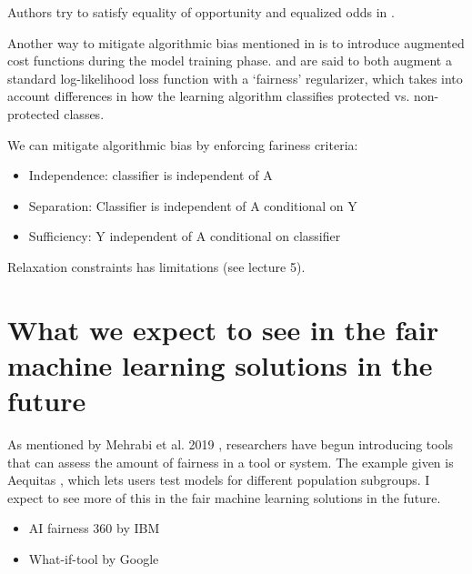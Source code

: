 \documentclass[conference]{IEEEtran}
\begin{document}
Authors try to satisfy equality of opportunity and equalized odds in \cite{DBLP:journals/corr/HardtPS16}.

Another way to mitigate algorithmic bias mentioned in \cite{d_Alessandro_2017} is to introduce augmented cost functions during the model training phase. \cite{article} and \cite{DBLP:journals/corr/Zliobaite15} are said to both augment a standard log-likelihood loss function with a ‘fairness’ regularizer, which takes into account differences in how the learning algorithm classifies protected vs. non-protected classes.

We can mitigate algorithmic bias by enforcing fariness criteria:
\begin{itemize}
    \item Independence: classifier is independent of A
    \item Separation: Classifier is independent of A conditional on Y
    \item Sufficiency: Y independent of A conditional on classifier
\end{itemize}

Relaxation constraints has limitations (see lecture 5).

\section{What we expect to see in the fair machine learning solutions in the future}
As mentioned by Mehrabi et al. 2019 \cite{DBLP:journals/corr/abs-1908-09635}, researchers have begun introducing tools that can assess the amount of fairness in a tool or system. The example given is Aequitas \cite{DBLP:journals/corr/abs-1811-05577}, which lets users test models for different population subgroups. I expect to see more of this in the fair machine learning solutions in the future.

\begin{itemize}
    \item AI fairness 360 by IBM
    \item What-if-tool by Google
\end{itemize}



\end{document}
